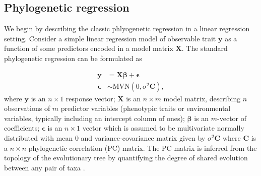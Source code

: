\documentclass[12pt]{article}
\begin{document}
\newcommand{\bX}{{\mathbf X}}
\newcommand{\bbeta}{{\boldsymbol \beta}}
\newcommand{\bmu}{{\boldsymbol \mu}}
\newcommand{\bY}{{\mathbf y}}  %
\newcommand{\bC}{{\mathbf C}}
\newcommand{\bZ}{{\mathbf Z}}
\newcommand{\bb}{{\mathbf b}}
\newcommand{\besp}{{\boldsymbol \epsilon}}
\newcommand{\bSigma}{{\boldsymbol \Sigma}}

\subsection*{Phylogenetic regression}

We begin by describing the classic phlyogenetic regression in a linear regression setting.
Consider a simple linear regression model of observable trait $\bY$ as a function of some predictors encoded in a model matrix $\bX$. 
The standard phylogenetic regression can be formulated as


\begin{equation}
\begin{aligned}
\bY & = \bX \bbeta + \besp  \\
\besp & \sim \textrm{MVN}(0,\sigma^{2} \bC), 
\label{eq:gls}
\end{aligned}
\end{equation}
where $\bY$ is an $n \times 1$ response vector; $\bX$ is an $n \times m$ model matrix, describing $n$ observations of $m$ predictor variables (phenotypic traits or environmental variables, typically including an intercept column of ones); $\bbeta$ is an $m$-vector of coefficients; $\besp$ is an $n \times 1$ vector which is assumed to be multivariate normally distributed with mean $0$ and variance-covariance matrix given by $\sigma^{2} \bC$ where $\bC$ is a $n \times n$ phylogenetic correlation (PC) matrix.
The PC matrix is inferred from the topology of the evolutionary tree by quantifying the degree of shared evolution between any pair of taxa \citep{garamszegi2014modern}.


\end{document}
